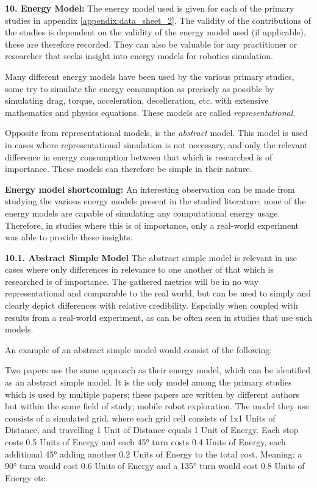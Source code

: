 \vspace{2mm}

\noindent\textbf{10. Energy Model:}
The energy model used is given for each of the primary studies in appendix \ref{appendix:data_sheet_2}.
The validity of the contributions of the studies is dependent on the validity of the energy model used (if applicable), 
these are therefore recorded. 
They can also be valuable for any practitioner or researcher that seeks insight into energy models for robotics simulation.

Many different energy models have been used by the various primary studies, some try to simulate the energy consumption 
as precisely as possible by simulating drag, torque, acceleration, decelleration, etc. with extensive mathematics and physics equations. 
These models are called \textit{representational}.

Opposite from representational models, is the \textit{abstract} model. 
This model is used in cases where representational simulation is not necessary, 
and only the relevant difference in energy consumption between that which is researched is of importance.
These models can therefore be simple in their nature.

\vspace{2mm} \noindent \textbf{Energy model shortcoming:}
An interesting observation can be made from studying the various energy models present in the studied literature; 
none of the energy models are capable of simulating any computational energy usage.
Therefore, in studies where this is of importance, only a real-world experiment was able to provide these insights.

\vspace{2mm} \noindent \textbf{10.1. Abstract Simple Model}
The abstract simple model is relevant in use cases where only differences in relevance to one another of that which is researched is of importance.
The gathered metrics will be in no way representational and comparable to the real world, 
but can be used to simply and clearly depict differences with relative credibility.
Espcially when coupled with results from a real-world experiment, as can be often seen in studies that use such models.

An example of an abstract simple model would consist of the following:

Two papers use the same approach as their energy model, which can be identified as an abstract simple model.
It is the only model among the primary studies which is used by multiple papers;
these papers are written by different authors but within the same field of study; mobile robot exploration.
The model they use consists of a simulated grid, where each grid cell consists of 1x1 Units of Distance, 
and travelling 1 Unit of Distance equals 1 Unit of Energy.
Each stop costs 0.5 Units of Energy and each 45° turn costs 0.4 Units of Energy, each additional 45° adding another 
0.2 Units of Energy to the total cost.
Meaning: a 90° turn would cost 0.6 Units of Energy and a 135° turn would cost 0.8 Units of Energy etc.

